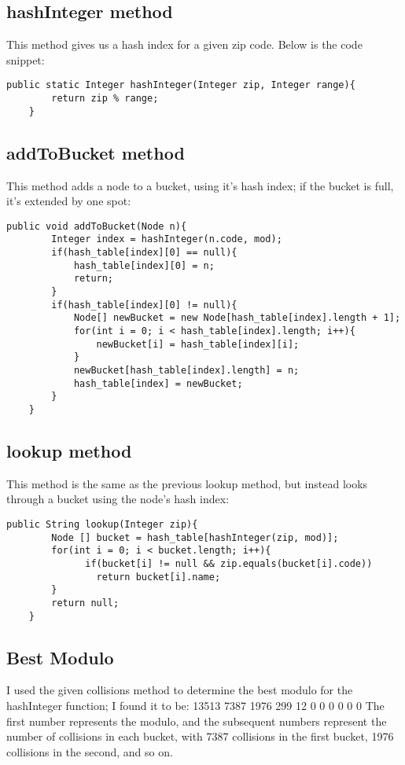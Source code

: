 \documentclass[a4paper,11pt]{article}
\begin{document}
\subsection*{hashInteger method}
This method gives us a hash index for a given zip code. Below is the code snippet:

\begin{verbatim}
public static Integer hashInteger(Integer zip, Integer range){
        return zip % range;
    }
\end{verbatim}

\subsection*{addToBucket method}
This method adds a node to a bucket, using it's hash index; if the bucket is full, it's extended by one spot:

\begin{verbatim}
public void addToBucket(Node n){
        Integer index = hashInteger(n.code, mod);
        if(hash_table[index][0] == null){
            hash_table[index][0] = n;
            return;
        }
        if(hash_table[index][0] != null){
            Node[] newBucket = new Node[hash_table[index].length + 1];
            for(int i = 0; i < hash_table[index].length; i++){
                newBucket[i] = hash_table[index][i];
            }
            newBucket[hash_table[index].length] = n;
            hash_table[index] = newBucket;
        }
    }
\end{verbatim}

\subsection*{lookup method}
This method is the same as the previous lookup method, but instead looks through a bucket using the node's hash index:

\begin{verbatim}
public String lookup(Integer zip){
        Node [] bucket = hash_table[hashInteger(zip, mod)];
        for(int i = 0; i < bucket.length; i++){
              if(bucket[i] != null && zip.equals(bucket[i].code))
                return bucket[i].name; 
        }
        return null;
    }
\end{verbatim}

\subsection*{Best Modulo}
I used the given collisions method to determine the best modulo for the hashInteger function; I found it to be:
13513   7387    1976     299     12       0         0         0         0       0       0
The first number represents the modulo, and the subsequent numbers represent the number of collisions in each bucket, with 7387 collisions in the first bucket, 1976 collisions in the second, and so on.
\end{document}
